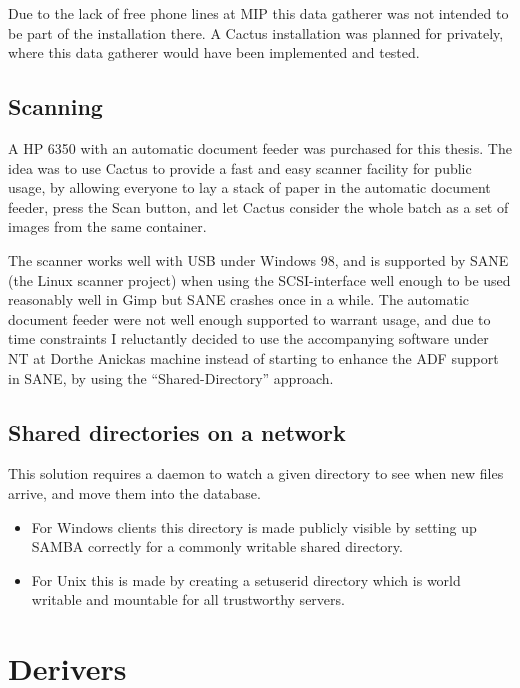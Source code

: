 Due to the lack of free phone lines at MIP this data gatherer was not
intended to be part of the installation there.  A Cactus installation
was planned for  privately,
where this data gatherer would have been implemented and tested.

\subsection{Scanning}

A HP 6350 with an automatic document feeder was purchased for this
thesis.  The idea was to use Cactus to provide a fast and easy scanner
facility for public usage, by allowing everyone to lay a stack of
paper in the automatic document feeder, press the Scan button, and let
Cactus consider the whole batch as a set of images from the same
container.

The scanner works well with USB under Windows 98, and is supported by
SANE (the Linux scanner project) when using the SCSI-interface well
enough to be used reasonably well in Gimp but SANE crashes once in a
while.  The automatic document feeder were not well enough supported
to warrant usage, and due to time constraints I reluctantly decided to
use the accompanying software under NT at Dorthe Anickas machine
instead of starting to enhance the ADF support in SANE, by using the
``Shared-Directory'' approach.


\subsection{Shared directories on a network}

This solution requires a daemon to watch a given directory to see when
new files arrive, and move them into the database.

\begin{itemize}
\item
For Windows clients this
directory is made publicly visible by setting up SAMBA correctly for a
commonly writable shared directory.

\item For Unix this is made by creating a setuserid directory which is
  world writable and mountable for all trustworthy servers.
\end{itemize}

\section{Derivers}

